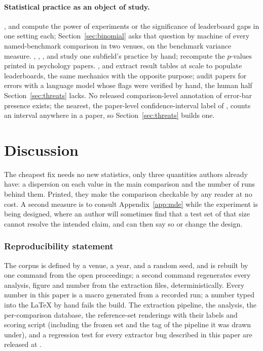 \documentclass{article}
\begin{document}
\paragraph{Statistical practice as an object of study.} \citet{card2020with},
\citet{colas2018how} and \citet{lin2021significant} compute the power of
experiments or the significance of leaderboard gaps in one setting each;
Section~\ref{sec:binomial} asks that question by machine of every
named-benchmark comparison in two venues, on the benchmark variance
\citet{madaan2024quantifying} measure. \citet{reimers2017reporting},
\citet{agarwal2021deep}, \citet{ulmer2022experimental},
\citet{marie2021scientific} and \citet{tang2020showing} study one subfield's
practice by hand; \citet{nuijten2016prevalence} recompute the $p$-values
printed in psychology papers. \citet{hou2019identification},
\citet{kardas2020axcell} and \citet{park2025can} extract result tables at
scale to populate leaderboards, the same mechanics with the opposite purpose;
\citet{bianchi2025err} audit papers for errors with a language model whose
flags were verified by hand, the human half Section~\ref{sec:threats} lacks.
No released comparison-level annotation of error-bar presence exists; the
nearest, the paper-level confidence-interval label of \citet{kirly2018nips},
counts an interval anywhere in a paper, so Section~\ref{sec:threats} builds
one.

\section{Discussion}
\label{sec:discussion}

The cheapest fix needs no new statistics, only three quantities authors
already have: a dispersion on each value in the main comparison and the number
of runs behind them. Printed, they make the comparison checkable by any reader
at no cost. A second measure is to consult Appendix~\ref{app:mde} while the
experiment is being designed, where an author will sometimes find that a test set of
that size cannot resolve the intended claim, and can then say so or change the
design.

\label{lastmainpage}

\subsubsection*{Reproducibility statement}
The corpus is defined by a venue, a year, and a random seed, and is rebuilt by
one command from the open proceedings; a second command regenerates every
analysis, figure and number from the extraction files, deterministically.
Every number in this paper is a macro generated from a recorded run; a number
typed into the LaTeX by hand fails the build. The extraction pipeline, the
analysis, the per-comparison database, the reference-set renderings with their
labels and scoring script (including the frozen set and the tag of the
pipeline it was drawn under), and a regression test for every extractor bug
described in this paper are released at \nReleaseUrl{}.
\end{document}
